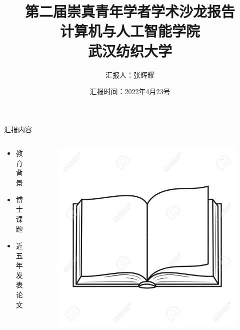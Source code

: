 \documentclass{beamer}
\title{第二届崇真青年学者学术沙龙报告\\
\large 计算机与人工智能学院 \\
\normalsize 武汉纺织大学}
\author{汇报人：张辉耀 }
\date{汇报时间：2022年4月23号}
\begin{document}
\begin{frame}
    \titlepage
\end{frame}

\begin{frame}{汇报内容}
	\begin{columns}
		\begin{column}{0.6\textwidth}
			\begin{itemize}
					\item 教育背景
					\item 博士课题
					\item 近五年发表论文
			\end{itemize}
		\end{column}
		\begin{column}{0.4\textwidth}
			\begin{figure}
				\includegraphics[width=1.0\linewidth]{book.png}
			\end{figure}
		\end{column}
	\end{columns}
\end{frame}
\end{document}

